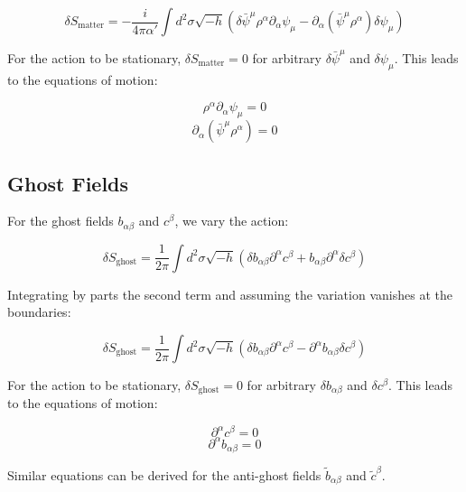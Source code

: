 \documentclass{article}
\begin{document}
\begin{equation}
\delta S_{\text{matter}} = -\frac{i}{4\pi\alpha'} \int d^2\sigma \sqrt{-h} (\delta\bar{\psi}^\mu \rho^\alpha \partial_\alpha \psi_\mu - \partial_\alpha(\bar{\psi}^\mu \rho^\alpha) \delta\psi_\mu)
\end{equation}

For the action to be stationary, $\delta S_{\text{matter}} = 0$ for arbitrary $\delta\bar{\psi}^\mu$ and $\delta\psi_\mu$. This leads to the equations of motion:

\begin{equation}
\rho^\alpha \partial_\alpha \psi_\mu = 0
\end{equation}
\begin{equation}
\partial_\alpha(\bar{\psi}^\mu \rho^\alpha) = 0
\end{equation}

\subsection{Ghost Fields}

For the ghost fields $b_{\alpha\beta}$ and $c^\beta$, we vary the action:

\begin{equation}
\delta S_{\text{ghost}} = \frac{1}{2\pi} \int d^2\sigma \sqrt{-h} (\delta b_{\alpha\beta} \partial^\alpha c^\beta + b_{\alpha\beta} \partial^\alpha \delta c^\beta)
\end{equation}

Integrating by parts the second term and assuming the variation vanishes at the boundaries:

\begin{equation}
\delta S_{\text{ghost}} = \frac{1}{2\pi} \int d^2\sigma \sqrt{-h} (\delta b_{\alpha\beta} \partial^\alpha c^\beta - \partial^\alpha b_{\alpha\beta} \delta c^\beta)
\end{equation}

For the action to be stationary, $\delta S_{\text{ghost}} = 0$ for arbitrary $\delta b_{\alpha\beta}$ and $\delta c^\beta$. This leads to the equations of motion:

\begin{equation}
\partial^\alpha c^\beta = 0
\end{equation}
\begin{equation}
\partial^\alpha b_{\alpha\beta} = 0
\end{equation}

Similar equations can be derived for the anti-ghost fields $\tilde{b}_{\alpha\beta}$ and $\tilde{c}^\beta$.
\end{document}
